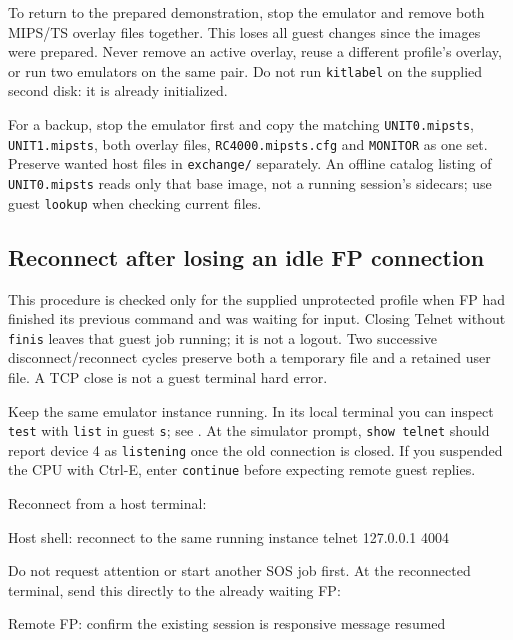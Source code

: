 To return to the prepared demonstration, stop the emulator and remove both
MIPS/TS overlay files together. This loses all guest changes since the images
were prepared. Never remove an active overlay, reuse a different profile's
overlay, or run two emulators on the same pair. Do not run \texttt{kitlabel}
on the supplied second disk: it is already initialized.

For a backup, stop the emulator first and copy the matching
\texttt{UNIT0.mipsts}, \texttt{UNIT1.mipsts}, both overlay files,
\texttt{RC4000.mipsts.cfg} and \texttt{MONITOR} as one set. Preserve wanted
host files in \texttt{exchange/} separately. An offline catalog listing of
\texttt{UNIT0.mipsts} reads only that base image, not a running session's
sidecars; use guest \texttt{lookup} when checking current files.

\subsection{Reconnect after losing an idle FP connection}\label{mips-ts-idle-reconnect}

This procedure is checked only for the supplied unprotected profile when FP
had finished its previous command and was waiting for input. Closing Telnet
without \texttt{finis} leaves that guest job running; it is not a logout.
Two successive disconnect/reconnect cycles preserve both a temporary file
and a retained user file. A TCP close is not a guest terminal hard error.

Keep the same emulator instance running. In its local terminal you can
inspect \texttt{test} with \texttt{list} in guest \texttt{s}; see
. At the simulator prompt,
\texttt{show telnet} should report device 4 as \texttt{listening} once the
old connection is closed. If you suspended the CPU with Ctrl-E, enter
\texttt{continue} before expecting remote guest replies.

Reconnect from a host terminal:

\begin{commandexample}[language=sh]{Host shell: reconnect to the same running instance}
telnet 127.0.0.1 4004
\end{commandexample}

Do not request attention or start another SOS job first. At the reconnected
terminal, send this directly to the already waiting FP:

\begin{commandexample}{Remote FP: confirm the existing session is responsive}
message resumed
\end{commandexample}

